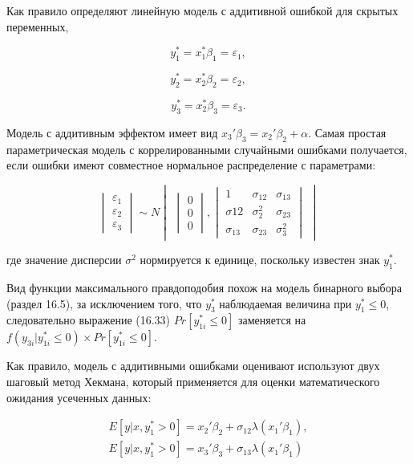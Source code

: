 Как правило определяют линейную модель с аддитивной ошибкой для скрытых переменных,

\begin{equation}
y_1^{*}=x_1^{*}\beta_1=\varepsilon_1,
\end{equation}

\[
y_2^{*}=x_2^{*}\beta_2=\varepsilon_2,
\]

\[
y_3^{*}=x_2^{*}\beta_3=\varepsilon_3.
\]

Модель с аддитивным эффектом имеет вид $x_3'\beta_3=x_2'\beta_2+\alpha$. Самая простая параметрическая модель с коррелированными случайными ошибками получается, если ошибки имеют совместное нормальное распределение с параметрами:

\begin{equation}
\begin{vmatrix}
\varepsilon_1 \\ \varepsilon_2 \\ \varepsilon_3
\end{vmatrix}
{\sim}N
\begin{vmatrix}
	\begin{vmatrix}
	0 \\ 0 \\ 0
	\end{vmatrix},
	\begin{vmatrix}
	1 & \sigma_{12} & \sigma_{13} \\
	\sigma{12} & \sigma_2^{2} & \sigma_{23} \\
	\sigma_{13} & \sigma_{23} & \sigma_3^2
	\end{vmatrix}
\end{vmatrix}
\end{equation}

где значение дисперсии $\sigma^2$ нормируется к единице, поскольку известен знак $y_1^{*}$.

Вид функции максимального правдоподобия похож на модель бинарного выбора (раздел 16.5), за исключением того, что $y_3^{*}$ наблюдаемая величина при $y_1^{*}{\leq}0$, следовательно выражение (16.33) $Pr[y_{1i}^{*}{\leq}0]$ заменяется на $f(y_{3i}|y_{1i}^*{\leq}0){\times}Pr[y_{1i}^{*}{\leq}0].$

Как правило, модель с аддитивными ошибками оценивают используют двух шаговый метод Хекмана, который применяется для оценки математического ожидания усеченных данных:

\begin{equation}
\begin{split}
E[y|x,y_1^{*}>0]=x_2'\beta_2+\sigma_{12}\lambda(x_1'\beta_1), \\
E[y|x,y_1^{*}>0]=x_3'\beta_3+\sigma_{13}\lambda(x_1'\beta_1)
\end{split}
\end{equation}

